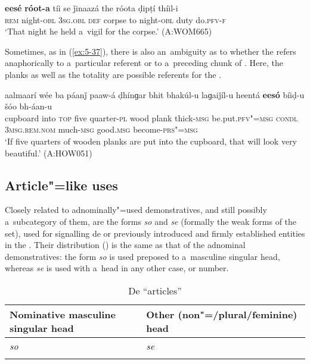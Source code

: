 \begin{exe}
\ex
\label{ex:5-36}
\gll \textbf{eesé} \textbf{róot-a} tíi se ǰinaazá the róota ḍipṭí thíil-i\\
\textsc{rem} night-\textsc{obl} \textsc{3sg.obl} \textsc{def} corpse to night-\textsc{obl} duty do.\textsc{pfv-f}\\
\glt `That night he held a~vigil for the corpse.' (A:WOM665)
\end{exe}

Sometimes, as in (\ref{ex:5-37}), there is also an~ambiguity as to whether the  refers anaphorically to a~particular  referent or to a~preceding chunk of . Here, the planks as well as the totality are possible referents for the .

\begin{exe}
\ex
\label{ex:5-37}
\gll aalmaarí wée ba páanǰ paaw-á ḍhínɡar bhit bhakúl-u laɡaiǰíl-u heentá \textbf{eesó} bíiḍ-u šóo bh-áan-u \\
cupboard into \textsc{top} five quarter-\textsc{pl} wood plank thick-\textsc{msg} be.put.\textsc{pfv"=msg} \textsc{condl} \textsc{3msg.rem.nom} much-\textsc{msg} good.\textsc{msg} become-\textsc{prs"=msg}\\
\glt `If five quarters of wooden planks are put into the cupboard, that will look very beautiful.'
(A:HOW051)
\end{exe}



\subsection{Article"=like uses}
\label{subsec:5-2-6}

Closely related to adnominally"=used demonstratives, and still possibly a~subcategory of them, are the forms \textit{so} and \textit{se} (formally the weak forms of the  set), used for signalling de or previously introduced and firmly established entities in the . Their distribution () is the same as that of the adnominal demonstratives: the form \textit{so} is used preposed to a~masculine singular  head, whereas \textit{se} is used with a~head in any other case,  or number. 


\begin{table}[ht]
 \caption{De ``articles''}
\begin{tabularx}{\textwidth}{ Q Q }
\lsptoprule
Nominative masculine singular head &
Other (non"=/plural/feminine) head\\\midrule
\textit{so} &
\textit{se} \\\lspbottomrule
\end{tabularx}
\label{tab:5-5}
\end{table}

